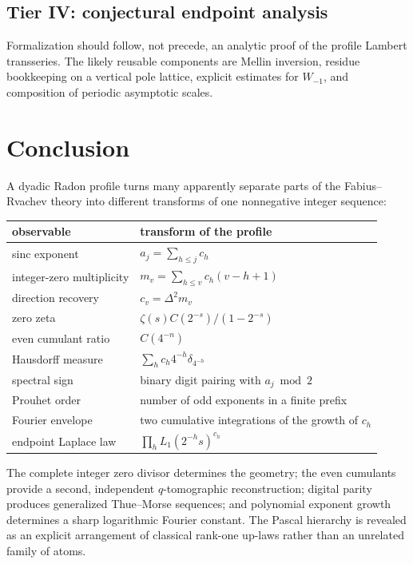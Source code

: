 \documentclass[11pt]{article}
\numberwithin{equation}{section}
\theoremstyle{definition}
\theoremstyle{remark}
\begin{document}
\subsection{Tier IV: conjectural endpoint analysis}
Formalization should follow, not precede, an analytic proof of the profile
Lambert transseries.  The likely reusable components are Mellin inversion,
residue bookkeeping on a vertical pole lattice, explicit estimates for
$W_{-1}$, and composition of periodic asymptotic scales.

\section{Conclusion}

A dyadic Radon profile turns many apparently separate parts of the
Fabius--Rvachev theory into different transforms of one nonnegative integer
sequence:
\begin{center}
\begin{tabularx}{0.92\textwidth}{@{}lX@{}}
\toprule
observable & transform of the profile \\
\midrule
sinc exponent & $a_j=\sum_{h\le j}c_h$ \\
integer-zero multiplicity & $m_v=\sum_{h\le v}c_h(v-h+1)$ \\
direction recovery & $c_v=\Delta^2m_v$ \\
zero zeta & $\zeta(s)C(2^{-s})/(1-2^{-s})$ \\
even cumulant ratio & $C(4^{-n})$ \\
Hausdorff measure & $\sum_hc_h4^{-h}\delta_{4^{-h}}$ \\
spectral sign & binary digit pairing with $a_j\bmod2$ \\
Prouhet order & number of odd exponents in a finite prefix \\
Fourier envelope & two cumulative integrations of the growth of $c_h$ \\
endpoint Laplace law & $\prod_hL_1(2^{-h}s)^{c_h}$ \\
\bottomrule
\end{tabularx}
\end{center}
The complete integer zero divisor determines the geometry; the even cumulants
provide a second, independent $q$-tomographic reconstruction; digital parity
produces generalized Thue--Morse sequences; and polynomial exponent growth
determines a sharp logarithmic Fourier constant.  The Pascal hierarchy is
revealed as an explicit arrangement of classical rank-one up-laws rather than
an unrelated family of atoms.
\end{document}
